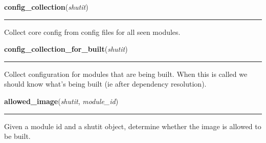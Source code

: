     \label{shutit_main:config_collection}

    \vspace{0.5ex}

\hspace{.8\funcindent}\begin{boxedminipage}{\funcwidth}

    \raggedright \textbf{config\_collection}(\textit{shutit})

    \vspace{-1.5ex}

    \rule{\textwidth}{0.5\fboxrule}
\setlength{\parskip}{2ex}
    Collect core config from config files for all seen modules.

\setlength{\parskip}{1ex}
    \end{boxedminipage}

    \label{shutit_main:config_collection_for_built}

    \vspace{0.5ex}

\hspace{.8\funcindent}\begin{boxedminipage}{\funcwidth}

    \raggedright \textbf{config\_collection\_for\_built}(\textit{shutit})

    \vspace{-1.5ex}

    \rule{\textwidth}{0.5\fboxrule}
\setlength{\parskip}{2ex}
    Collect configuration for modules that are being built. When this is 
    called we should know what's being built (ie after dependency 
    resolution).

\setlength{\parskip}{1ex}
    \end{boxedminipage}

    \label{shutit_main:allowed_image}

    \vspace{0.5ex}

\hspace{.8\funcindent}\begin{boxedminipage}{\funcwidth}

    \raggedright \textbf{allowed\_image}(\textit{shutit}, \textit{module\_id})

    \vspace{-1.5ex}

    \rule{\textwidth}{0.5\fboxrule}
\setlength{\parskip}{2ex}
    Given a module id and a shutit object, determine whether the image is 
    allowed to be built.

\setlength{\parskip}{1ex}
    \end{boxedminipage}


